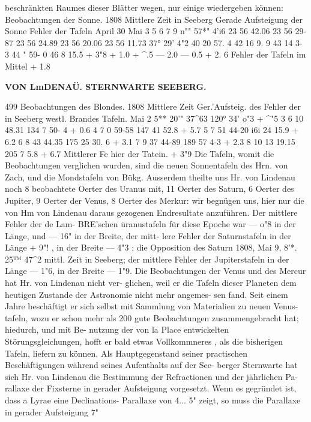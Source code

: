 \documentclass[12pt,a4paper]{article}
\begin{document}
beschränkten  Raumes  dieser  Blätter  wegen,  nur einige  wiedergeben  können: Beobachtungen  der  Sonne. 1808 Mittlere  Zeit in  Seeberg Gerade  Aufsteigung der  Sonne Fehler  der Tafeln April  30 Mai       3 5 6 7 9 n""  57*"    4'i6 23     56     42.06 23     56     29-87 23     56     24.89 23     56     20.06 23     56     11.73 37°   29'     4"2 40     20     57. 4 42  16      9. 9 43  14       3-  3 44  "     59- 0 46       8     15.5 +  3"8 +  1.0 +  \textasciicircum{}.5 ---  2.0 ---  0.5 +  2.  6 Fehler  der Tafeln  im  Mittel +  1.8

\vspace{0.5em}


\noindent\textbf{VON  LmDENAÜ.     STERNWARTE   SEEBERG.}

499 Beobachtungen  des  Blondes. 1808 Mittlere  Zeit Ger.'Aufsteig.  des Fehler  der in  Seeberg westl.  Brandes Tafeln. Mai  2 5**  20'"  37\textasciicircum{}63 120°  34'     o"3 +  \textasciicircum{}"5 3 6     10     48.31 134      7     50- 4 +  0.6 4 7       0     59-58 147     41     52.8 +  5.7 5 7     51     44-20 i6i     24     15.9 +  6.2 6 8     43     44.35 175     25     30. 6 +  3.1 7 9     37     44-89 189     57       4-3 +  2.3 8 10     13     19.15 205       7       5.8 +  6.7 Mittlerer  Fe hier  der  Tatein. +  3"9 Die  Tafeln,   womit   die  Beobachtungen  verglichen  wurden,   sind   die  neuen  Sonnentafeln   des  Hrn.  von Zach,  und  die  Mondstafeln  von  Bükg. Ausserdem  theilte  uns  Hr.  von  Lindenau  noch  8  beobachtete  Oerter  des  Uranus  mit,  11  Oerter des  Saturn,  6  Oerter  des  Jupiter,  9  Oerter  der  Venus,  8  Oerter  des  Merkur:  wir  begnügen  uns,  hier  nur die  von  Hm  von  Lindenau  daraus  gezogenen  Endresultate  anzuführen.  Der  mittlere  Fehler  der  de  Lam- BRE'schen  üranustafeln  für  diese  Epoche  war  ---  o"8  in  der  Länge,  und  --- 16"  in  der  Breite,  der  mitt- lere Fehler  der  Saturnstafeln  in  der  Länge  +  9"! ,  in  der  Breite  ---  4"3 ;  die  Opposition  des  Saturn  1808, Mai  9,  8'*.  25™  47\textasciicircum{}2  mittl.  Zeit  in  Seeberg;  der  mittlere  Fehler  der  Jupiterstafeln  in  der  Länge  --- 1"6, in  der  Breite  --- 1"9.  Die  Beobachtungen  der  Venus  und  des  Mercur  hat  Hr.  von  Lindenau  nicht  ver- glichen, weil  er  die  Tafeln  dieser  Planeten  dem  heutigen  Zustande  der  Astronomie  nicht  mehr  angemes- sen fand.  Seit  einem  Jahre  beschäftigt  er  sich  selbst  mit  Sammlung  von  Materialien  zu  neuen  Venus- tafeln, wozu  er  schon  mehr  als  200  gute  Beobachtungen  zusammengebracht  hat;  hiedurch,  und  mit  Be- nutzung der  von  la  Place  entwickelten  Störungsgleichungen,  hofft  er  bald  etwas  Vollkommneres ,  als die  bisherigen  Tafeln,  liefern  zu  können. Als  Hauptgegenstand  seiner  practischen  Beschäftigungen  während  seines  Aufenthalts  auf  der  See- berger  Sternwarte  hat  sich  Hr.  von  Lindenau  die  Bestimmung  der  Refractionen  und  der  jährlichen  Pa- rallaxe der  Fixsterne  in  gerader  Aufsteigung  vorgesetzt.  Wenn  es  gegründet  ist,  dass  a  Lyrae  eine Declinations- Parallaxe  von  4... 5"  zeigt,  so  muss  die  Parallaxe  in  gerader  Aufsteigung  7"  
\end{document}
